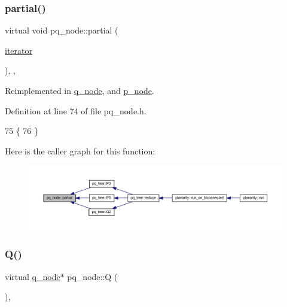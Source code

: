 \subsubsection{\texorpdfstring{partial()}{partial()}}
{\footnotesize\ttfamily virtual void pq\+\_\+node\+::partial (\begin{DoxyParamCaption}\item[{\mbox{\hyperlink{classpq__node_a34898c9eb1527787c07e8ebefd6bfba5}{iterator}}}]{ }\end{DoxyParamCaption})\hspace{0.3cm}{\ttfamily [inline]}, {\ttfamily [protected]}, {\ttfamily [virtual]}}



Reimplemented in \mbox{\hyperlink{classq__node_a4d17efa229bcea76ffebc92c2e4da3a3}{q\+\_\+node}}, and \mbox{\hyperlink{classp__node_a217e83b61144fe6b64e3fbade0aecfcf}{p\+\_\+node}}.



Definition at line 74 of file pq\+\_\+node.\+h.


\begin{DoxyCode}
75     \{
76     \}
\end{DoxyCode}
Here is the caller graph for this function\+:
\nopagebreak
\begin{figure}[H]
\begin{center}
\leavevmode
\includegraphics[width=350pt]{classpq__node_aa6830ab47a280f41fe61b7d2f8b508bb_icgraph}
\end{center}
\end{figure}
\mbox{\label{classpq__node_aeeefcfcd19dbe4ca94e190006e8dd484}} 
\subsubsection{\texorpdfstring{Q()}{Q()}}
{\footnotesize\ttfamily virtual \mbox{\hyperlink{classq__node}{q\+\_\+node}}$\ast$ pq\+\_\+node\+::Q (\begin{DoxyParamCaption}{ }\end{DoxyParamCaption})\hspace{0.3cm}{\ttfamily [protected]}, {}}



